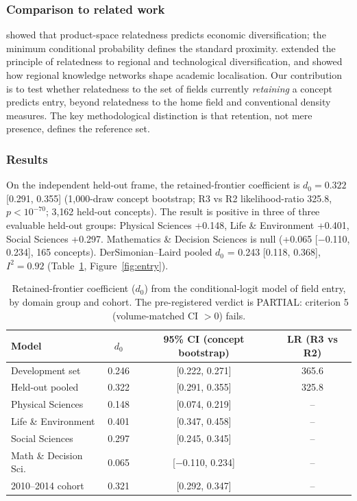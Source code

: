 \documentclass[11pt,letterpaper]{article}
\begin{document}
\subsubsection{Comparison to related work}

\citet{Hidalgo2007} showed that product-space relatedness predicts economic diversification; the minimum conditional probability defines the standard proximity. \citet{Boschma2015} extended the principle of relatedness to regional and technological diversification, and \citet{Fitzgerald2021} showed how regional knowledge networks shape academic localisation. Our contribution is to test whether relatedness to the set of fields currently \emph{retaining} a concept predicts entry, beyond relatedness to the home field and conventional density measures. The key methodological distinction is that retention, not mere presence, defines the reference set.

\subsubsection{Results}

On the independent held-out frame, the retained-frontier coefficient is $d_0 = 0.322$ [0.291, 0.355] (1{,}000-draw concept bootstrap; R3 vs R2 likelihood-ratio 325.8, $p < 10^{-70}$; 3{,}162 held-out concepts). The result is positive in three of three evaluable held-out groups: Physical Sciences +0.148, Life \& Environment +0.401, Social Sciences +0.297. Mathematics \& Decision Sciences is null (+0.065 [$-$0.110, 0.234], 165 concepts). DerSimonian--Laird pooled $d_0$ = 0.243 [0.118, 0.368], $I^2 = 0.92$ (Table~\ref{tab:entry}, Figure~\ref{fig:entry}).

\begin{table}[!htbp]
\centering
\caption{Retained-frontier coefficient ($d_0$) from the conditional-logit model of field entry, by domain group and cohort. The pre-registered verdict is PARTIAL: criterion 5 (volume-matched CI $> 0$) fails.}
\label{tab:entry}
\small
\begin{tabular}{lccc}
\toprule
Model & $d_0$ & 95\% CI (concept bootstrap) & LR (R3 vs R2) \\
\midrule
Development set & 0.246 & [0.222, 0.271] & 365.6 \\
Held-out pooled & 0.322 & [0.291, 0.355] & 325.8 \\
Physical Sciences & 0.148 & [0.074, 0.219] & -- \\
Life \& Environment & 0.401 & [0.347, 0.458] & -- \\
Social Sciences & 0.297 & [0.245, 0.345] & -- \\
Math \& Decision Sci. & 0.065 & [$-$0.110, 0.234] & -- \\
2010--2014 cohort & 0.321 & [0.292, 0.347] & -- \\
\bottomrule
\end{tabular}
\end{table}
\end{document}
